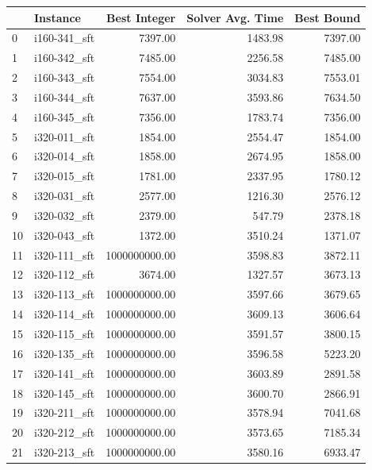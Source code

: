 \begin{tabular}{llrrr}
\toprule
{} &      Instance &  Best Integer &  Solver Avg. Time &  Best Bound \\
\midrule
0  &  i160-341\_sft &       7397.00 &           1483.98 &     7397.00 \\
1  &  i160-342\_sft &       7485.00 &           2256.58 &     7485.00 \\
2  &  i160-343\_sft &       7554.00 &           3034.83 &     7553.01 \\
3  &  i160-344\_sft &       7637.00 &           3593.86 &     7634.50 \\
4  &  i160-345\_sft &       7356.00 &           1783.74 &     7356.00 \\
5  &  i320-011\_sft &       1854.00 &           2554.47 &     1854.00 \\
6  &  i320-014\_sft &       1858.00 &           2674.95 &     1858.00 \\
7  &  i320-015\_sft &       1781.00 &           2337.95 &     1780.12 \\
8  &  i320-031\_sft &       2577.00 &           1216.30 &     2576.12 \\
9  &  i320-032\_sft &       2379.00 &            547.79 &     2378.18 \\
10 &  i320-043\_sft &       1372.00 &           3510.24 &     1371.07 \\
11 &  i320-111\_sft & 1000000000.00 &           3598.83 &     3872.11 \\
12 &  i320-112\_sft &       3674.00 &           1327.57 &     3673.13 \\
13 &  i320-113\_sft & 1000000000.00 &           3597.66 &     3679.65 \\
14 &  i320-114\_sft & 1000000000.00 &           3609.13 &     3606.64 \\
15 &  i320-115\_sft & 1000000000.00 &           3591.57 &     3800.15 \\
16 &  i320-135\_sft & 1000000000.00 &           3596.58 &     5223.20 \\
17 &  i320-141\_sft & 1000000000.00 &           3603.89 &     2891.58 \\
18 &  i320-145\_sft & 1000000000.00 &           3600.70 &     2866.91 \\
19 &  i320-211\_sft & 1000000000.00 &           3578.94 &     7041.68 \\
20 &  i320-212\_sft & 1000000000.00 &           3573.65 &     7185.34 \\
21 &  i320-213\_sft & 1000000000.00 &           3580.16 &     6933.47 \\

\end{tabular}

